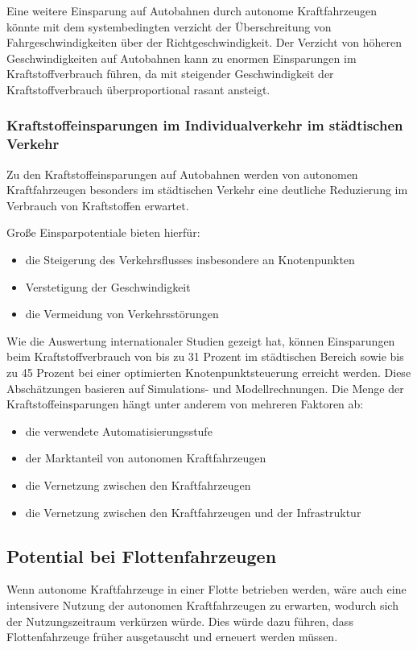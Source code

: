 Eine weitere Einsparung auf Autobahnen durch autonome Kraftfahrzeugen könnte mit
dem systembedingten verzicht der Überschreitung von Fahrgeschwindigkeiten über der Richtgeschwindigkeit.
Der Verzicht von höheren Geschwindigkeiten auf Autobahnen kann zu enormen Einsparungen im Kraftstoffverbrauch führen,
da mit steigender Geschwindigkeit der Kraftstoffverbrauch überproportional rasant ansteigt.

\subsubsection{Kraftstoffeinsparungen im Individualverkehr im städtischen Verkehr}
Zu den Kraftstoffeinsparungen auf Autobahnen werden von
autonomen Kraftfahrzeugen besonders im städtischen Verkehr
eine deutliche Reduzierung im Verbrauch von Kraftstoffen erwartet.

Große Einsparpotentiale bieten hierfür:
\begin{itemize}
	\item die Steigerung des Verkehrsflusses insbesondere an Knotenpunkten
	\item Verstetigung der Geschwindigkeit
	\item die Vermeidung von Verkehrsstörungen
\end{itemize}

Wie die Auswertung internationaler Studien
\cite{Transportation} gezeigt hat,
können Einsparungen beim Kraftstoffverbrauch von
bis zu 31 Prozent im städtischen Bereich sowie
bis zu 45 Prozent bei einer optimierten Knotenpunktsteuerung erreicht werden.
Diese Abschätzungen basieren auf Simulations- und Modellrechnungen.
Die Menge der  Kraftstoffeinsparungen hängt unter anderem von mehreren Faktoren ab:
\begin{itemize}
	\item die verwendete Automatisierungsstufe
	\item der Marktanteil von autonomen Kraftfahrzeugen
	\item die Vernetzung zwischen den Kraftfahrzeugen
	\item die Vernetzung zwischen den Kraftfahrzeugen und der Infrastruktur
\end{itemize}

\subsection{Potential bei Flottenfahrzeugen}
Wenn autonome Kraftfahrzeuge in einer Flotte betrieben werden, wäre auch eine intensivere Nutzung der autonomen Kraftfahrzeugen zu erwarten,
wodurch sich der Nutzungszeitraum verkürzen würde.
Dies würde dazu führen, dass Flottenfahrzeuge früher ausgetauscht und erneuert werden müssen.

